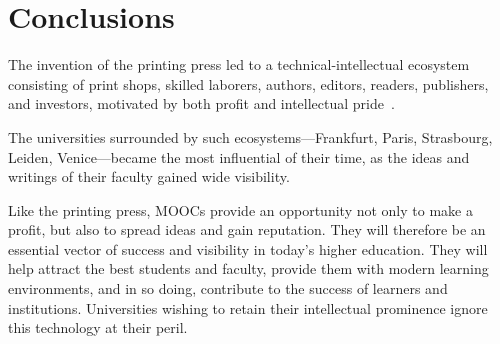 \section{Conclusions}



The invention of the printing press led to a
technical-intellectual ecosystem consisting of print shops, skilled
laborers, authors, editors, readers, publishers, and investors,
motivated by both profit and intellectual pride~\cite{febvre}.

The universities surrounded by such ecosystems---Frankfurt, Paris,
Strasbourg, Leiden, Venice---became the most influential of their
time, as the ideas and writings of their faculty gained wide visibility.

Like the printing press, 
MOOCs provide an opportunity not only to make a profit, but also
to spread ideas and gain reputation. They will therefore be an
essential vector of success and visibility in today's higher
education. They will help attract the best students and
faculty, provide them with modern learning environments, and in so doing,
contribute to the success of learners and institutions.
Universities wishing to retain their intellectual
prominence ignore this technology at their peril.




